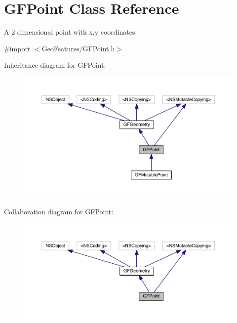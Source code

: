 \hypertarget{interface_g_f_point}{}\section{G\+F\+Point Class Reference}
\label{interface_g_f_point}


A 2 dimensional point with x,y coordinates.  




{\ttfamily \#import $<$Geo\+Features/\+G\+F\+Point.\+h$>$}



Inheritance diagram for G\+F\+Point\+:\nopagebreak
\begin{figure}[H]
\begin{center}
\leavevmode
\includegraphics[width=350pt]{interface_g_f_point__inherit__graph}
\end{center}
\end{figure}


Collaboration diagram for G\+F\+Point\+:\nopagebreak
\begin{figure}[H]
\begin{center}
\leavevmode
\includegraphics[width=350pt]{interface_g_f_point__coll__graph}
\end{center}
\end{figure}
